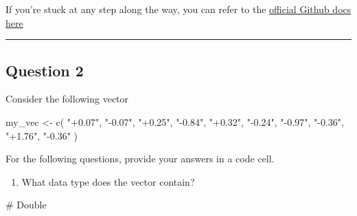 \documentclass[
  letterpaper,
  DIV=11,
  numbers=noendperiod]{scrartcl}
\newenvironment{Shaded}{\begin{snugshade}}{\end{snugshade}}
\newcommand{\CommentTok}[1]{\textcolor[rgb]{0.37,0.37,0.37}{#1}}
\newcommand{\FunctionTok}[1]{\textcolor[rgb]{0.28,0.35,0.67}{#1}}
\newcommand{\NormalTok}[1]{\textcolor[rgb]{0.00,0.23,0.31}{#1}}
\newcommand{\OtherTok}[1]{\textcolor[rgb]{0.00,0.23,0.31}{#1}}
\newcommand{\StringTok}[1]{\textcolor[rgb]{0.13,0.47,0.30}{#1}}
\providecommand{\tightlist}{%
  \setlength{\itemsep}{0pt}\setlength{\parskip}{0pt}}\usepackage{longtable,booktabs,array}
\begin{document}
If you're stuck at any step along the way, you can refer to the
\href{https://docs.github.com/en/pull-requests/collaborating-with-pull-requests/proposing-changes-to-your-work-with-pull-requests/creating-a-pull-request-from-a-fork}{official
Github docs here}

\begin{center}\rule{0.5\linewidth}{0.5pt}\end{center}

\hypertarget{question-2}{%
\subsection{Question 2}\label{question-2}}

\begin{tcolorbox}[enhanced jigsaw, opacityback=0, rightrule=.15mm, leftrule=.75mm, colframe=quarto-callout-tip-color-frame, bottomrule=.15mm, opacitybacktitle=0.6, colbacktitle=quarto-callout-tip-color!10!white, toptitle=1mm, coltitle=black, bottomtitle=1mm, left=2mm, breakable, arc=.35mm, titlerule=0mm, title=\textcolor{quarto-callout-tip-color}{\faLightbulb}\hspace{0.5em}{30 points}, toprule=.15mm, colback=white]

\end{tcolorbox}

Consider the following vector

\begin{Shaded}
\begin{Highlighting}[]
\NormalTok{my\_vec }\OtherTok{\textless{}{-}} \FunctionTok{c}\NormalTok{(}
    \StringTok{"+0.07"}\NormalTok{,}
    \StringTok{"{-}0.07"}\NormalTok{,}
    \StringTok{"+0.25"}\NormalTok{,}
    \StringTok{"{-}0.84"}\NormalTok{,}
    \StringTok{"+0.32"}\NormalTok{,}
    \StringTok{"{-}0.24"}\NormalTok{,}
    \StringTok{"{-}0.97"}\NormalTok{,}
    \StringTok{"{-}0.36"}\NormalTok{,}
    \StringTok{"+1.76"}\NormalTok{,}
    \StringTok{"{-}0.36"}
\NormalTok{)}
\end{Highlighting}
\end{Shaded}

For the following questions, provide your answers in a code cell.

\begin{enumerate}
\def\labelenumi{\arabic{enumi}.}
\tightlist
\item
  What data type does the vector contain?
\end{enumerate}

\begin{Shaded}
\begin{Highlighting}[]
\CommentTok{\# Double}
\end{Highlighting}
\end{Shaded}
\end{document}
